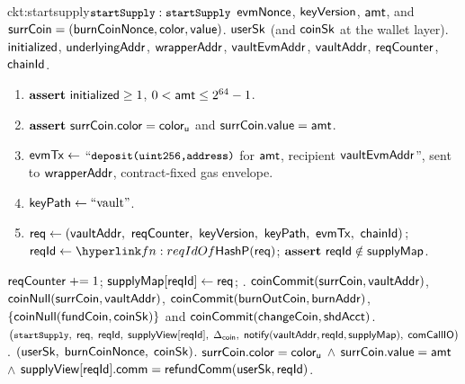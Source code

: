 \begin{CktBox}{ckt:startsupply}{$\texttt{\small startSupply}: \texttt{\small startSupply}$}
 $\mathsf{evmNonce}$, $\mathsf{keyVersion}$, $\mathsf{amt}$, and
$\mathsf{surrCoin} = (\mathsf{burnCoinNonce}, \mathsf{color}, \mathsf{value})$.
 $\mathsf{userSk}$ (and $\mathsf{coinSk}$ at the wallet layer).
 $\mathsf{initialized}$, $\mathsf{underlyingAddr}$, $\mathsf{wrapperAddr}$, $\mathsf{vaultEvmAddr}$, $\mathsf{vaultAddr}$, $\mathsf{reqCounter}$,
$\mathsf{chainId}$.
\begin{enumerate}[nosep,leftmargin=1.7em,topsep=2pt]
\item $\textbf{assert}~ \mathsf{initialized} \geq 1$, \; $0 < \mathsf{amt} \leq 2^{64}-1$.
\item $\textbf{assert}~ \mathsf{surrCoin}.\mathsf{color} = \mathsf{color}_{\mathsf{u}}$ \; and \; $\mathsf{surrCoin}.\mathsf{value} = \mathsf{amt}$.
\item $\mathsf{evmTx} \gets$ ``$\texttt{\small deposit(uint256,address)}$ for $\mathsf{amt}$, recipient $\mathsf{vaultEvmAddr}$'', sent to
      $\mathsf{wrapperAddr}$, contract-fixed gas envelope.
\item $\mathsf{keyPath} \gets \text{``vault''}$.
\item $\req \gets (\vaultAddr\bc \sigNonce\bc \keyVer\bc \keyPath\bc \evmTxOf\bc \chainId)$; \;
      $\rid \gets \lnk{fn:reqIdOf}{\reqIdOf(\req)}$; \; $\textbf{assert}~ \mathsf{reqId} \notin \mathsf{supplyMap}$.
\end{enumerate}
\begin{OutList}
\oitem{\Dvault} $\mathsf{reqCounter} \mathrel{+}= 1$; \; $\mathsf{supplyMap}[\mathsf{reqId}] \gets \mathsf{req}$; \;
  .
\oitem{\Dshd} \bluedot $\mathsf{coinCommit}(\mathsf{surrCoin}, \mathsf{vaultAddr})$, \;
  \bluedot $\mathsf{coinNull}(\mathsf{surrCoin}, \mathsf{vaultAddr})$, \;
  \bluedot $\mathsf{coinCommit}(\mathsf{burnOutCoin}, \mathsf{burnAddr})$, \;
  \bluedot $\{\mathsf{coinNull}(\mathsf{fundCoin}, \mathsf{coinSk})\}$ and $\mathsf{coinCommit}(\mathsf{changeCoin}, \mathsf{shdAcct})$.
\oitem{\stmt} $\bigl(\texttt{\small startSupply},\; \mathsf{req},\; \mathsf{reqId},\; \mathsf{supplyView}[\mathsf{reqId}],\; \Delta_{\mathsf{coin}},\;
  \mathsf{notify}(\mathsf{vaultAddr}, \mathsf{reqId}, \mathsf{supplyMap}),\; \mathsf{comCallIO}\bigr)$.
\oitem{\wit} $(\mathsf{userSk},\; \mathsf{burnCoinNonce},\; \mathsf{coinSk})$.
\oitem{\Rel} $\mathsf{surrCoin}.\mathsf{color} = \mathsf{color}_{\mathsf{u}}$ \;$\wedge$\; $\mathsf{surrCoin}.\mathsf{value} = \mathsf{amt}$
  \;$\wedge$\; $\mathsf{supplyView}[\mathsf{reqId}].\mathsf{comm} = \mathsf{refundComm}(\mathsf{userSk}, \mathsf{reqId})$.
\end{OutList}
\end{CktBox}


